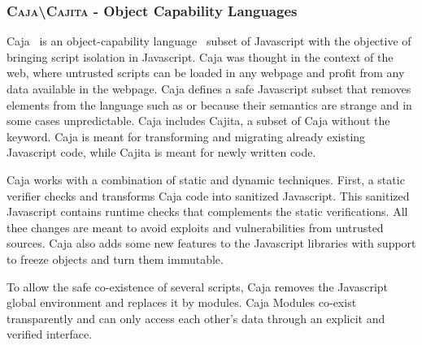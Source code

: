 \subsubsection*{\textsc{Caja\textbackslash Cajita} - Object Capability Languages}

Caja~\cite{Mill08a} is an object-capability language~\cite{Levy84a,Mill03a,Spoo00a} subset of Javascript with the objective of bringing script isolation in Javascript. Caja was thought in the context of the web, where untrusted scripts can be loaded in any webpage and profit from any data available in the webpage. Caja defines a safe Javascript subset that removes elements from the language such as  or  because their semantics are strange and in some cases unpredictable. Caja includes Cajita, a subset of Caja without the  keyword. Caja is meant for transforming and migrating already existing Javascript code, while Cajita is meant for newly written code.

Caja works with a combination of static and dynamic techniques. First, a static verifier checks and transforms Caja code into sanitized Javascript. This sanitized Javascript contains runtime checks that complements the static verifications. All thee changes are meant to avoid exploits and vulnerabilities from untrusted sources. Caja also adds some new features to the Javascript libraries with support to freeze objects and turn them immutable. 

To allow the safe co-existence of several scripts, Caja removes the Javascript global environment and replaces it by modules. Caja Modules co-exist transparently and can only access each other's data through an explicit and verified interface.
%


